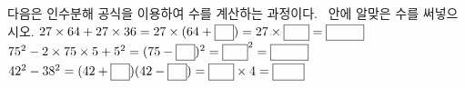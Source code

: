 다음은 인수분해 공식을 이용하여 수를 계산하는 과정이다. \blank\ 안에 알맞은 수를 써넣으시오.
 $27\times64+27\times36=27\times(64+\blank)=27\times\blank[2em]=\blank[3em]$
 $75^2-2\times75\times5+5^2=(75-\blank)^2=\blank[2em]^2=\blank[3em]$
 $42^2-38^2=(42+\blank)(42-\blank)=\blank[2em]\times4=\blank[2.5em]$
